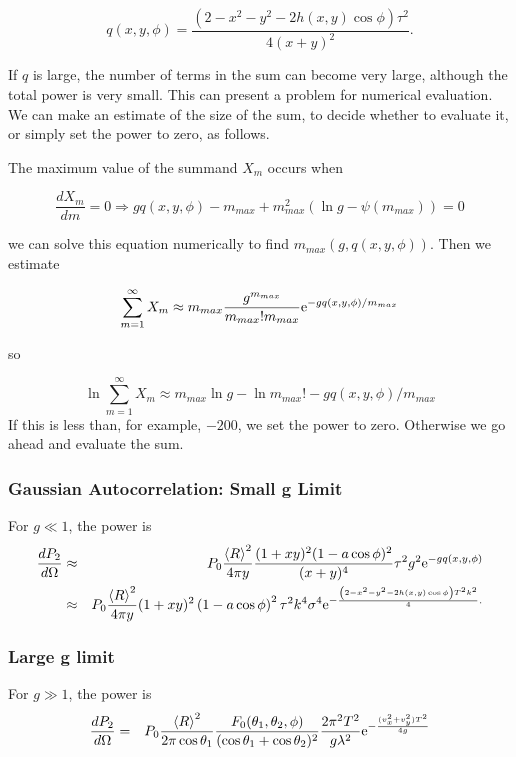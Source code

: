 \documentclass[11pt]{article}
\newcommand{\der}[2]{\frac{d {#1}}{d {#2}}}
\newcommand{\e}{{\rm e}}
\begin{document}
{{{{$$q(x,y,\phi)=\frac{\left(2-x^{2}-y^{2}-2h(x,y)\cos\phi\right)\tau^{2}}{4(x+y)^{2}}.$$

If $q$ is large, the number of terms in the sum can become very large,
although the total power is very small. This can present a problem for
numerical evaluation.  We can make an estimate of the size of the sum,
to decide whether to evaluate it, or simply set the power to zero, as
follows.

The maximum value of the summand $X_{m}$ occurs when

$$\der{X_{m}}{m}=0\Rightarrow gq(x,y,\phi)-m_{max}+m_{max}^{2}(\ln g-\psi(m_{max}))=0$$

we can solve this equation numerically to find $m_{max}(g,q(x,y,\phi)).$ Then we estimate

$$\sum_{m=1}^{\infty}X_{m}\approx m_{max}\frac{g^{m_{max}}}{m_{max}!m_{max}}\e^{-gq(x,y,\phi)/m_{max}}$$

so

$$\ln\sum_{m=1}^{\infty}X_{m}\approx m_{max}\ln g - \ln m_{max}!-gq(x,y,\phi)/m_{max}$$
If this is less than, for example, $-200$, we set the power to zero. Otherwise we go ahead and evaluate the sum.

\subsubsection{Gaussian Autocorrelation: Small g Limit}

For $g\ll 1$, the power is
\begin{eqnarray}
\der{P_{2}}{\Omega}&\approx&P_{0}\frac{\left<R\right>^{2}}{4\pi y}\frac{(1+xy)^{2}(1-a\cos\phi)^{2}}{(x+y)^{4}}\tau^{2}g^{2}\e^{-gq(x,y,\phi)}\\
&\approx&P_{0}\frac{\left<R\right>^{2}}{4\pi y}(1+xy)^{2}\left(1-a\cos\phi\right)^{2}\tau^{2}k^{4}\sigma^{4}\e^{-\frac{\left(2-x^{2}-y^{2}-2h(x,y)\cos\phi\right)T^{2}k^{2}}{4}.}
\end{eqnarray}

\subsubsection{Large g limit}
For $g\gg 1$, the power is
\begin{eqnarray}
\der{P_{2}}{\Omega}&=&P_{0}\frac{\left<R\right>^{2}}{2\pi\cos\theta_{1}}\frac{F_{0}(\theta_{1},\theta_{2},\phi)}{(\cos{\theta_{1}}+\cos{\theta_{2}})^{2}}\frac{2\pi^{2}T^{2}}{g\lambda^{2}}\e^{-\frac{(v_{x}^{2}+v_{y}^{2})T^{2}}{4g}}\end{eqnarray}

}}}}
\end{document}
